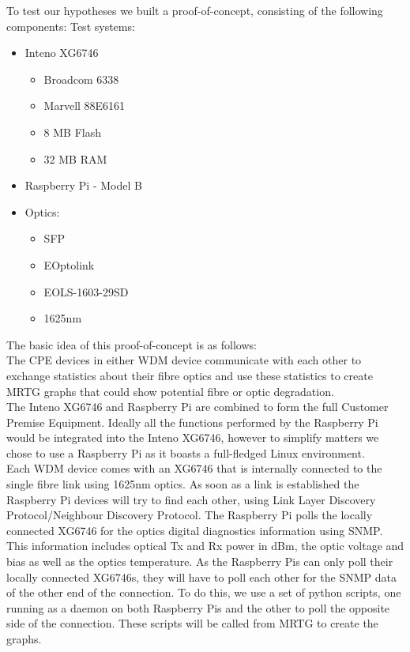 \documentclass{article}
\begin{document}
To test our hypotheses we built a proof-of-concept, consisting of the following components:
Test systems: 
\begin{itemize}
\item Inteno XG6746 \cite{Inteno:XG6746}
\begin{itemize}
\item Broadcom 6338
\item Marvell 88E6161
\item 8 MB Flash
\item 32 MB RAM
\end{itemize}


\item Raspberry Pi - Model B

\item Optics:
\begin{itemize}
\item SFP
\item EOptolink
\item EOLS-1603-29SD
\item 1625nm
\end{itemize}
\end{itemize}

The basic idea of this proof-of-concept is as follows:\\

The CPE devices in either WDM device communicate with each other to exchange statistics about their fibre optics and use these statistics to create MRTG graphs that could show potential fibre or optic degradation.\\

The Inteno XG6746 and Raspberry Pi are combined to form the full Customer Premise Equipment.
Ideally all the functions performed by the Raspberry Pi would be integrated into the Inteno XG6746, however to simplify matters we chose to use a Raspberry Pi as it boasts a full-fledged Linux environment.\\
Each WDM device comes with an XG6746 that is internally connected to the single fibre link using 1625nm optics.
As soon as a link is established the Raspberry Pi devices will try to find each other, using Link Layer Discovery Protocol/Neighbour Discovery Protocol.
The Raspberry Pi polls the locally connected XG6746 for the optics digital diagnostics information using SNMP.
This information includes optical Tx and Rx power in dBm, the optic voltage and bias as well as the optics temperature.
As the Raspberry Pis can only poll their locally connected XG6746s, they will have to poll each other for the SNMP data of the other end of the connection.
To do this, we use a set of python scripts, one running as a daemon on both Raspberry Pis and the other to poll the opposite side of the connection.  These scripts will be called from MRTG to create the graphs.
\end{document}
